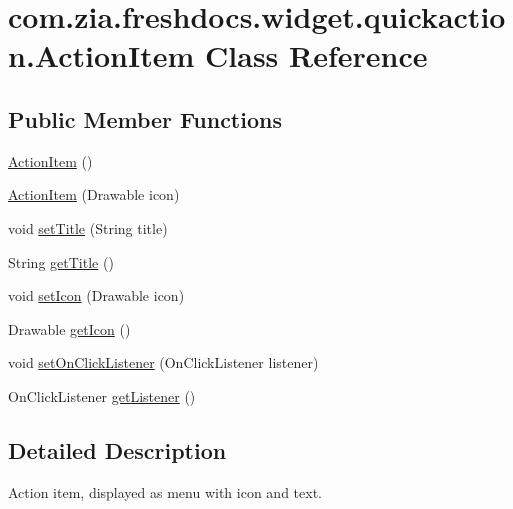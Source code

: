 \hypertarget{classcom_1_1zia_1_1freshdocs_1_1widget_1_1quickaction_1_1_action_item}{\section{com.\-zia.\-freshdocs.\-widget.\-quickaction.\-Action\-Item Class Reference}
\label{classcom_1_1zia_1_1freshdocs_1_1widget_1_1quickaction_1_1_action_item}
}
\subsection*{Public Member Functions}
\begin{DoxyCompactItemize}
\item 
\hyperlink{classcom_1_1zia_1_1freshdocs_1_1widget_1_1quickaction_1_1_action_item_a506746f06f5ef4421683e93a9b7b6f18}{Action\-Item} ()
\item 
\hyperlink{classcom_1_1zia_1_1freshdocs_1_1widget_1_1quickaction_1_1_action_item_af01160822d565b0fa5549293e7e5bbda}{Action\-Item} (Drawable icon)
\item 
void \hyperlink{classcom_1_1zia_1_1freshdocs_1_1widget_1_1quickaction_1_1_action_item_ad9f253cf5605dc6b8bbc38c6ec4cdd40}{set\-Title} (String title)
\item 
String \hyperlink{classcom_1_1zia_1_1freshdocs_1_1widget_1_1quickaction_1_1_action_item_aa035abdbbd024ab3cfce38bfbf1021fe}{get\-Title} ()
\item 
void \hyperlink{classcom_1_1zia_1_1freshdocs_1_1widget_1_1quickaction_1_1_action_item_a9f251fe96a1417a305d2a44dda15aeb8}{set\-Icon} (Drawable icon)
\item 
Drawable \hyperlink{classcom_1_1zia_1_1freshdocs_1_1widget_1_1quickaction_1_1_action_item_a11ffaa8e6d5c53d5f252dd78f44f7f1d}{get\-Icon} ()
\item 
void \hyperlink{classcom_1_1zia_1_1freshdocs_1_1widget_1_1quickaction_1_1_action_item_aca116d00f6dfc9bc7b136e667bfc36c4}{set\-On\-Click\-Listener} (On\-Click\-Listener listener)
\item 
On\-Click\-Listener \hyperlink{classcom_1_1zia_1_1freshdocs_1_1widget_1_1quickaction_1_1_action_item_a8f42dd4f2119cd7a41c178ca04d1ee74}{get\-Listener} ()
\end{DoxyCompactItemize}


\subsection{Detailed Description}
Action item, displayed as menu with icon and text.

